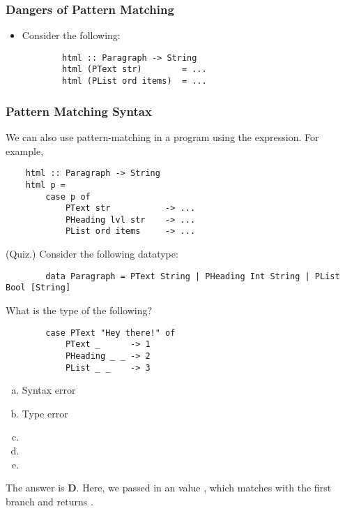 \documentclass[letterpaper]{article}
\begin{document}
\subsubsection{Dangers of Pattern Matching}
\begin{itemize}
    \item Consider the following: 
    \begin{verbatim}
        html :: Paragraph -> String 
        html (PText str)        = ... 
        html (PList ord items)  = ... \end{verbatim}
\end{itemize}

\subsubsection{Pattern Matching Syntax}
We can also use pattern-matching in a program using the  expression. For example, 
\begin{verbatim}
    html :: Paragraph -> String 
    html p = 
        case p of 
            PText str           -> ...
            PHeading lvl str    -> ... 
            PList ord items     -> ... \end{verbatim}

\begin{mdframed}[]
    (Quiz.) Consider the following datatype:
    \begin{verbatim}
        data Paragraph = PText String | PHeading Int String | PList Bool [String]\end{verbatim}
    What is the type of the following?
    \begin{verbatim}
        case PText "Hey there!" of 
            PText _      -> 1
            PHeading _ _ -> 2
            PList _ _    -> 3\end{verbatim}
    
    \begin{enumerate}[(a)]
        \item Syntax error 
        \item Type error 
        \item {}
        \item {}
        \item {}
    \end{enumerate} 

    \begin{mdframed}[]
        The answer is \textbf{D}. Here, we passed in an value , which matches with the first branch and returns .
    \end{mdframed}
\end{mdframed}
\end{document}
